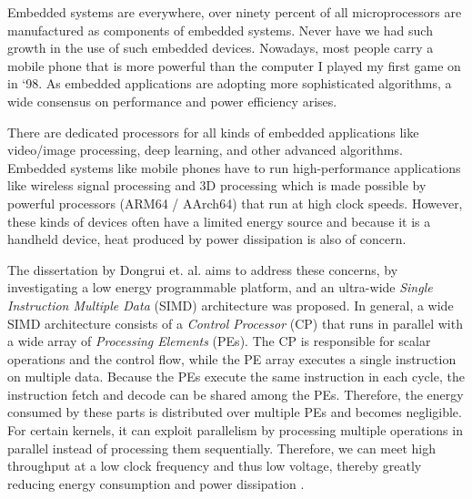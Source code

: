 



Embedded systems are everywhere, over ninety percent of all microprocessors are manufactured as components of embedded systems.
Never have we had such growth in the use of such embedded devices. Nowadays, most people carry a mobile phone that is more powerful than the computer I played my first game on in `98. As embedded applications are adopting more sophisticated algorithms, a wide consensus on performance and power efficiency arises. %

There are dedicated processors for all kinds of embedded applications like video/image processing, deep learning, and other advanced algorithms.
Embedded systems like mobile phones have to run high-performance applications like wireless signal processing and 3D processing \cite{dongrio1} which is made possible by powerful processors (ARM64 / AArch64) that run at high clock speeds. However, these kinds of devices often have a limited energy source and because it is a handheld device, heat produced by power dissipation is also of concern.


The dissertation by Dongrui et. al. \cite{dongrui} aims to address these concerns, by investigating a low energy programmable platform, and an ultra-wide \emph{Single Instruction Multiple Data} (SIMD) architecture was proposed. In general, a wide SIMD architecture consists of a \emph{Control Processor} (CP) that runs in parallel with a wide array of \emph{Processing Elements} (PEs). The CP is responsible for scalar operations and the control flow, while the PE array executes a single instruction on multiple data. Because the PEs execute the same instruction in each cycle, the instruction fetch and decode can be shared among the PEs. Therefore, the energy consumed by these parts is distributed over multiple PEs and becomes negligible. For certain kernels, it can exploit parallelism by processing multiple operations in parallel instead of processing them sequentially. Therefore, we can meet high throughput at a low clock frequency and thus low voltage, thereby greatly reducing energy consumption and power dissipation \cite{dongrio2}.%

